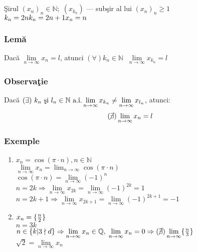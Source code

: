 \documentclass[a4paper, 12pt, notitlepage]{book}
\begin{document}
    \subsection{}
    \c{S}irul ${(x_{n})}_{n} \in \mathbb{N}; \; (x_{k_{n}})$ --- sub\c{s}ir al lui ${(x_{n})}_{n} \ge 1$\\[5pt]
    \begin{math}
      k_{n} = 2n\\
      k_{n} = 2n+1\\
      x_{n} = n
    \end{math}
    \subsubsection{Lem\u{a}}
    Dac\u{a} $\lim\limits_{n\to\infty} x_{n} = l$, atunci $(\forall) k_{n} \in \mathbb{N}\;\; \lim\limits_{n\to\infty} x_{k_{n}} = l$
    \subsubsection{Observa\c{t}ie}
    Dac\u{a} $(\exists)\ k_{n} \text{ \c{s}i } l_{n} \in \mathbb{N} \text{ a.\^{\i}.} \lim\limits_{n\to\infty} x_{k_{n}} \ne \lim\limits_{n\to\infty} x_{l_{n}}$, atunci:
    \[ (\cancel{\exists}) \lim\limits_{n\to\infty} x_{n} = l\]
    \subsubsection{Exemple}
    \begin{enumerate}
      \item $x_{n} = \cos (\pi \cdot n), n \in \mathbb{N}$\\[5pt]
            $\lim\limits_{n\to\infty} x_{n} = \lim_{n\to\infty} \cos (\pi \cdot n)$\\[5pt]
            $\cos (\pi \cdot n) = \lim\limits_{n\to\infty} {(-1)}^{n}$\\[5pt]
            $n = 2k \Rightarrow \lim\limits_{n\to\infty} x_{2k} = \lim\limits_{n\to\infty} {(-1)}^{2k} = 1$\\[5pt]
            $n = 2k+1 \Rightarrow \lim\limits_{n\to\infty} x_{2k+1} = \lim\limits_{n\to\infty} {(-1)}^{2k+1} = -1$
      \item $x_{n} = \{ {n \over 2} \}$\\[5pt]
            $n = 3k$\\[5pt]
            $n \in \{ k| 3 \nmid d \} \Rightarrow \lim\limits_{n\to\infty} x_{n} \in \mathbb{Q},\; \lim\limits_{n\to\infty} x_{n} = 0 \Rightarrow (\cancel{\exists}) \lim\limits_{n\to\infty} \{ {n \over 3} \}$\\[5pt]
            $\sqrt{2} = \lim\limits_{n\to\infty} x_{n}$
    \end{enumerate}
\end{document}
